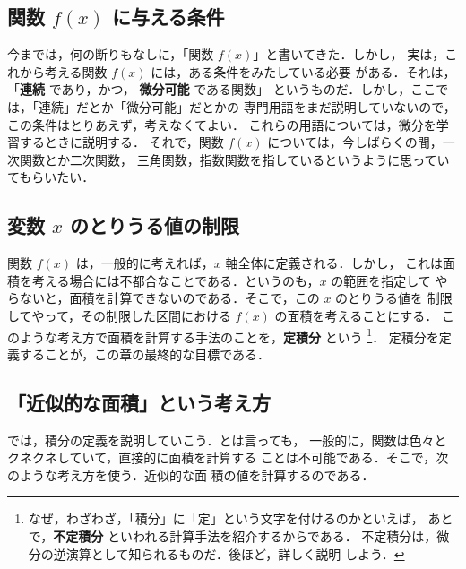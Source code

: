             \subsection{関数 $f(x)$ に与える条件}
                今までは，何の断りもなしに，「関数 $f(x)$」と書いてきた．しかし，
                実は，これから考える関数 $f(x)$ には，ある条件をみたしている必要
                がある．それは，
                「\textbf{連続} であり，かつ， \textbf{微分可能} である関数」
                というものだ．しかし，ここでは，「連続」だとか「微分可能」だとかの
                専門用語をまだ説明していないので，この条件はとりあえず，考えなくてよい．
                これらの用語については，微分を学習するときに説明する．
                それで，関数 $f(x)$ については，今しばらくの間，一次関数とか二次関数，
                三角関数，指数関数を指しているというように思っていてもらいたい．

            \subsection{変数 $x$ のとりうる値の制限}
                関数 $f(x)$ は，一般的に考えれば，$x$ 軸全体に定義される．しかし，
                これは面積を考える場合には不都合なことである．というのも，$x$ の範囲を指定して
                やらないと，面積を計算できないのである．そこで，この $x$ のとりうる値を
                制限してやって，その制限した区間における $f(x)$ の面積を考えることにする．
                このような考え方で面積を計算する手法のことを，\textbf{定積分} という
                    \footnote{
                        なぜ，わざわざ，「積分」に「定」という文字を付けるのかといえば，
                        あとで，\textbf{不定積分} といわれる計算手法を紹介するからである．
                        不定積分は，微分の逆演算として知られるものだ．後ほど，詳しく説明
                        しよう．
                    }．
                定積分を定義することが，この章の最終的な目標である．

            \subsection{「近似的な面積」という考え方}
                \begin{mycomment}
                    では，積分の定義を説明していこう．とは言っても，
                    一般的に，関数は色々とクネクネしていて，直接的に面積を計算する
                    ことは不可能である．そこで，次のような考え方を使う．近似的な面
                    積の値を計算するのである．
                \end{mycomment}


